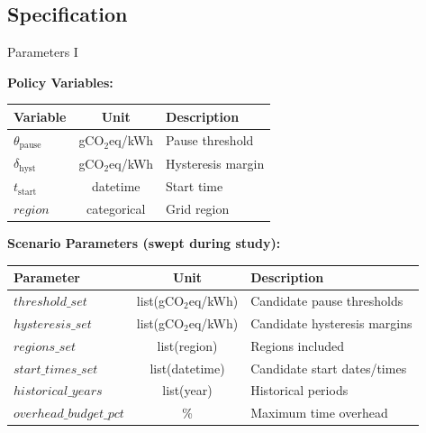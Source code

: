 \subsection{Specification}

\begin{frame}[t]{Parameters I}{}

  \small

  \textbf{Policy Variables:}
  \newline
  \begin{tabular}{l|c|l}
    \toprule
    Variable & Unit & Description \\
    \midrule
    $\theta_{\text{pause}}$ & gCO$_2$eq/kWh & Pause threshold \\
    $\delta_{\text{hyst}}$ & gCO$_2$eq/kWh & Hysteresis margin \\
    $t_{\text{start}}$ & datetime & Start time \\
    $\mathit{region}$ & categorical & Grid region \\
    \bottomrule
  \end{tabular}%

  \vspace{1cm}

  \textbf{Scenario Parameters (swept during study):}
  \newline
  \begin{tabular}{l|c|l}
    \toprule
    Parameter & Unit & Description \\
    \midrule
    $\mathit{threshold\_set}$ & list(gCO$_2$eq/kWh) & Candidate pause
    thresholds \\
    $\mathit{hysteresis\_set}$ & list(gCO$_2$eq/kWh) & Candidate
    hysteresis margins \\
    $\mathit{regions\_set}$ & list(region) & Regions included \\
    $\mathit{start\_times\_set}$ & list(datetime) & Candidate start
    dates/times \\
    $\mathit{historical\_years}$ & list(year) & Historical periods \\
    $\mathit{overhead\_budget\_pct}$ & \% & Maximum time overhead \\
    \bottomrule
  \end{tabular}%

\end{frame}
